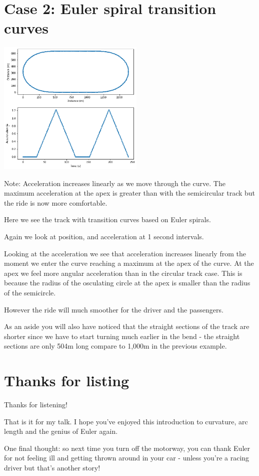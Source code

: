\documentclass[12pt]{article} %
\theoremstyle{definition}
\theoremstyle{theorem}
\begin{document}
\section{Case 2: Euler spiral transition curves}
\begin{tcolorbox}
	\begin{minipage}{\linewidth}
		\centering
		\includegraphics[width=70mm, scale=0.2]{euler_track.png}
	\end{minipage}
	Note: Acceleration increases linearly as we move through the curve.		
	The maximum acceleration at the apex is greater than with the semicircular track but the ride is now more comfortable.
\end{tcolorbox}

Here we see the track with transition curves based on Euler spirals. 

Again we look at position, and acceleration at 1 second intervals. 

Looking at the acceleration we see that acceleration increases linearly from the moment we enter the curve reaching a maximum at the apex of the curve. At the apex we feel more angular acceleration than in the circular track case. This is because the radius of the osculating circle at the apex is smaller than the radius of the semicircle.

However the ride will much smoother for the driver and the passengers.

As an aside you will also have noticed that the straight sections of the track are shorter since we have to start turning much earlier in the bend - the straight sections are only 504m long compare to 1,000m in the previous example.

\section{Thanks for listing}
\begin{tcolorbox}
	\centering
	Thanks for listening!
\end{tcolorbox}

That is it for my talk. I hope you've enjoyed this introduction to curvature, arc length and the genius of Euler again.

One final thought: so next time you turn off the motorway, you can thank Euler for not feeling ill and getting thrown around in your car - unless you're a racing driver but that's another story!
\end{document}
